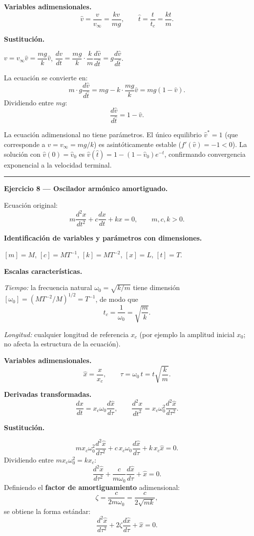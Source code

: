 \documentclass[12pt,letterpaper]{article}
\begin{document}
\textbf{Variables adimensionales.}
\[
  \hat{v}=\frac{v}{v_\infty}=\frac{kv}{mg},\qquad
  \hat{t}=\frac{t}{t_c}=\frac{kt}{m}.
\]

\textbf{Sustitución.}

$v=v_\infty\hat{v}=\dfrac{mg}{k}\hat{v}$,\quad
$\dfrac{dv}{dt}=\dfrac{mg}{k}\cdot\dfrac{k}{m}\dfrac{d\hat{v}}{d\hat{t}}=g\dfrac{d\hat{v}}{d\hat{t}}$.

La ecuación se convierte en:
\[
  m\cdot g\frac{d\hat{v}}{d\hat{t}}=mg-k\cdot\frac{mg}{k}\hat{v}=mg(1-\hat{v}).
\]
Dividiendo entre $mg$:
\[
  \boxed{\frac{d\hat{v}}{d\hat{t}}=1-\hat{v}.}
\]

La ecuación adimensional no tiene parámetros.
El único equilibrio $\hat{v}^*=1$ (que corresponde a $v=v_\infty=mg/k$) es
asintóticamente estable ($f'(\hat{v})=-1<0$).
La solución con $\hat{v}(0)=\hat{v}_0$ es $\hat{v}(\hat{t})=1-(1-\hat{v}_0)e^{-\hat{t}}$,
confirmando convergencia exponencial a la velocidad terminal.

\bigskip
\noindent\rule{\textwidth}{0.3pt}
\bigskip

\noindent\textbf{Ejercicio 8 — Oscilador armónico amortiguado.}

Ecuación original:
\[
  m\frac{d^2x}{dt^2}+c\frac{dx}{dt}+kx=0,\qquad m,c,k>0.
\]

\textbf{Identificación de variables y parámetros con dimensiones.}

$[m]=M$, $[c]=MT^{-1}$, $[k]=MT^{-2}$, $[x]=L$, $[t]=T$.

\textbf{Escalas características.}

\emph{Tiempo:} la frecuencia natural $\omega_0=\sqrt{k/m}$ tiene dimensión
$[\omega_0]=(MT^{-2}/M)^{1/2}=T^{-1}$, de modo que
\[
  t_c=\frac{1}{\omega_0}=\sqrt{\frac{m}{k}}.
\]

\emph{Longitud:} cualquier longitud de referencia $x_c$ (por ejemplo la amplitud
inicial $x_0$; no afecta la estructura de la ecuación).

\textbf{Variables adimensionales.}
\[
  \hat{x}=\frac{x}{x_c},\qquad
  \tau=\omega_0\,t=t\sqrt{\frac{k}{m}}.
\]

\textbf{Derivadas transformadas.}
\[
  \frac{dx}{dt}=x_c\omega_0\frac{d\hat{x}}{d\tau},\qquad
  \frac{d^2x}{dt^2}=x_c\omega_0^2\frac{d^2\hat{x}}{d\tau^2}.
\]

\textbf{Sustitución.}

\[
  m x_c\omega_0^2\frac{d^2\hat{x}}{d\tau^2}
  +c\,x_c\omega_0\frac{d\hat{x}}{d\tau}
  +k\,x_c\hat{x}=0.
\]
Dividiendo entre $mx_c\omega_0^2=kx_c$:
\[
  \frac{d^2\hat{x}}{d\tau^2}
  +\frac{c}{m\omega_0}\frac{d\hat{x}}{d\tau}
  +\hat{x}=0.
\]
Definiendo el \textbf{factor de amortiguamiento} adimensional:
\[
  \zeta=\frac{c}{2m\omega_0}=\frac{c}{2\sqrt{mk}},
\]
se obtiene la forma estándar:
\[
  \boxed{\frac{d^2\hat{x}}{d\tau^2}+2\zeta\frac{d\hat{x}}{d\tau}+\hat{x}=0.}
\]
\end{document}

